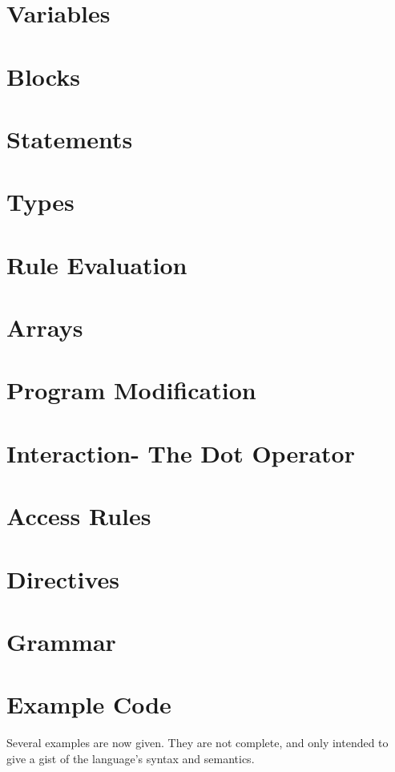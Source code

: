 \documentclass[onecolumn,titlepage]{article}
\begin{document}
\section{Variables}

\section{Blocks}

\section{Statements}

\section{Types}

\section{Rule Evaluation}

\section{Arrays}

\section{Program Modification}

\section{Interaction- The Dot Operator}

\section{Access Rules}

\section{Directives}

\section{Grammar}

\section{Example Code}
Several examples are now given.  They are not complete, and only intended
to give a gist of the language's syntax and semantics.
\end{document}
